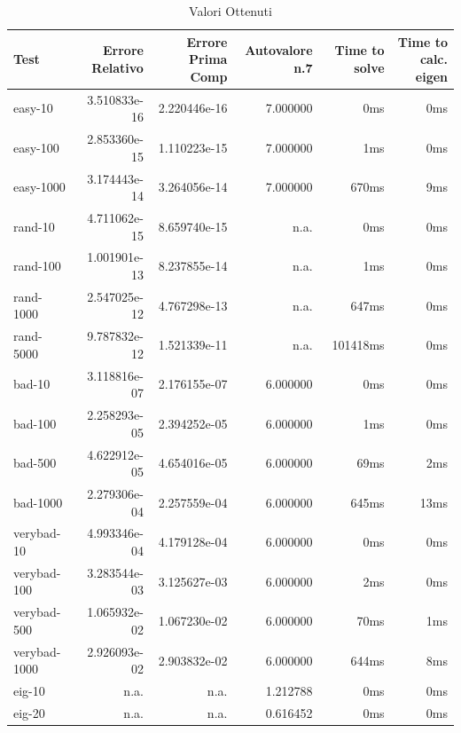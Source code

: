 \documentclass[12pt]{article}
\begin{document}
\begin{table}[h]
\caption {Valori Ottenuti} \label{tab:title}
\begin{center}
\begin{tabular}{|l|r|r|r|r|r|}
\hline
Test         &	Errore Relativo  &	Errore Prima Comp  & Autovalore n.7    &	Time to solve &	Time to calc. eigen \\
\hline
     easy-10 &	    3.510833e-16 &	      2.220446e-16 &           7.000000 & 	0ms		 	 &		0ms   \\
    easy-100 &	    2.853360e-15 &	      1.110223e-15 &           7.000000 & 	1ms		 	 &		0ms   \\
   easy-1000 &	    3.174443e-14 &	      3.264056e-14 &           7.000000 &	670ms		 &		9ms   \\
     rand-10 &	    4.711062e-15 &	      8.659740e-15 &               n.a. & 	0ms		 	 &		0ms   \\
    rand-100 &	    1.001901e-13 &	      8.237855e-14 &               n.a. & 	1ms		 	 &		0ms   \\
   rand-1000 &	    2.547025e-12 &	      4.767298e-13 &               n.a. &	647ms		 &		0ms   \\
   rand-5000 &	    9.787832e-12 &	      1.521339e-11 &               n.a. &	101418ms	 &		0ms   \\
      bad-10 &	    3.118816e-07 &	      2.176155e-07 &           6.000000 & 	0ms		 	 &		0ms   \\
     bad-100 &	    2.258293e-05 &	      2.394252e-05 &           6.000000 & 	1ms		 	 &		0ms   \\
     bad-500 &	    4.622912e-05 &	      4.654016e-05 &           6.000000 &	69ms		 &		2ms   \\
    bad-1000 &	    2.279306e-04 &	      2.257559e-04 &           6.000000 &	645ms		&		13ms  \\
  verybad-10 &	    4.993346e-04 &	      4.179128e-04 &           6.000000 & 	0ms		 	&		0ms   \\
 verybad-100 &	    3.283544e-03 &	      3.125627e-03 &           6.000000 & 	2ms		 	&		0ms   \\
 verybad-500 &	    1.065932e-02 &	      1.067230e-02 &           6.000000 &	70ms		 &		1ms   \\
verybad-1000 &	    2.926093e-02 &	      2.903832e-02 &           6.000000 &	644ms		 &		8ms   \\
      eig-10 &	            n.a. &	              n.a. &           1.212788 & 	0ms		 	&		0ms   \\
      eig-20 &	            n.a. &	              n.a. &           0.616452 & 	0ms		 &			0ms   \\

\end{tabular}
\end{center}
\end{table}
\end{document}
